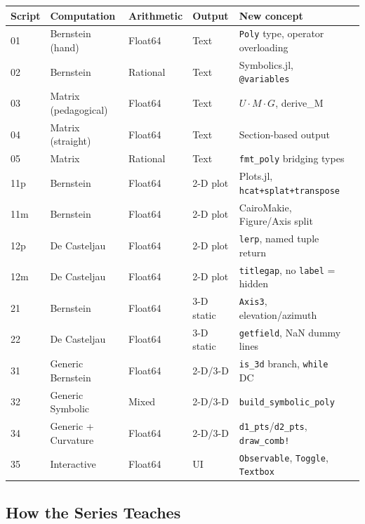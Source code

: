 \documentclass[12pt, a4paper]{article}
\newcommand{\cd}[1]{\texttt{#1}}
\begin{document}
\begin{center}
\renewcommand{\arraystretch}{1.25}
\begin{tabular}{llllll}
\toprule
Script & Computation & Arithmetic & Output & New concept \\
\midrule
\rowcolor{examplebg}
01 & Bernstein (hand) & Float64 & Text & \cd{Poly} type, operator overloading \\
02 & Bernstein & Rational & Text & Symbolics.jl, \cd{@variables} \\
\rowcolor{examplebg}
03 & Matrix (pedagogical) & Float64 & Text & $U \cdot M \cdot G$, derive\_M \\
04 & Matrix (straight) & Float64 & Text & Section-based output \\
\rowcolor{examplebg}
05 & Matrix & Rational & Text & \cd{fmt\_poly} bridging types \\
\midrule
11p & Bernstein & Float64 & 2-D plot & Plots.jl, \cd{hcat+splat+transpose} \\
\rowcolor{examplebg}
11m & Bernstein & Float64 & 2-D plot & CairoMakie, Figure/Axis split \\
12p & De Casteljau & Float64 & 2-D plot & \cd{lerp}, named tuple return \\
\rowcolor{examplebg}
12m & De Casteljau & Float64 & 2-D plot & \cd{titlegap}, no \cd{label} = hidden \\
\midrule
21 & Bernstein & Float64 & 3-D static & \cd{Axis3}, elevation/azimuth \\
\rowcolor{examplebg}
22 & De Casteljau & Float64 & 3-D static & \cd{getfield}, NaN dummy lines \\
31 & Generic Bernstein & Float64 & 2-D/3-D & \cd{is\_3d} branch, \cd{while} DC \\
\rowcolor{examplebg}
32 & Generic Symbolic & Mixed & 2-D/3-D & \cd{build\_symbolic\_poly} \\
34 & Generic + Curvature & Float64 & 2-D/3-D & \cd{d1\_pts}/\cd{d2\_pts}, \cd{draw\_comb!} \\
\rowcolor{examplebg}
35 & Interactive & Float64 & UI & \cd{Observable}, \cd{Toggle}, \cd{Textbox} \\
\bottomrule
\end{tabular}
\end{center}

\subsection{How the Series Teaches}
\end{document}
